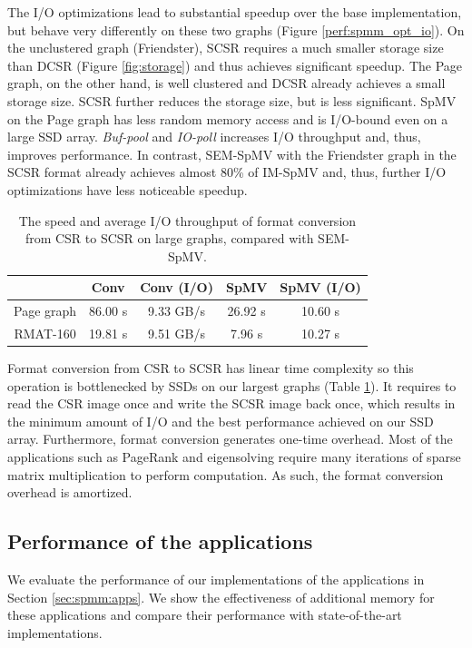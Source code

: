 The I/O optimizations lead to substantial speedup over the base implementation,
but behave very differently on these two graphs (Figure \ref{perf:spmm_opt_io}).
On the unclustered graph (Friendster), SCSR requires a much smaller storage size
than DCSR (Figure \ref{fig:storage}) and thus achieves significant
speedup. The Page graph, on the other hand, is well clustered and DCSR already
achieves a small storage size. SCSR further reduces the storage size, but is
less significant. SpMV on the Page graph has less random memory access and is
I/O-bound even on a large SSD array. \textit{Buf-pool} and \textit{IO-poll}
increases I/O throughput and, thus, improves performance. In contrast, SEM-SpMV
with the Friendster graph in the SCSR format already achieves almost 80\% of
IM-SpMV and, thus, further I/O optimizations have less noticeable speedup.

\begin{table}
\begin{center}
\footnotesize
\begin{tabular}{|c|c|c|c|c|}
\hline
	& Conv & Conv (I/O) & SpMV & SpMV (I/O) \\
\hline
Page graph & 86.00 s & 9.33 GB/s & 26.92 s & 10.60 s\\
\hline
RMAT-160 & 19.81 s & 9.51 GB/s & 7.96 s & 10.27 s\\
\hline
\end{tabular}
\normalsize
\end{center}
\caption{The speed and average I/O throughput of format conversion from CSR
	to SCSR on large graphs, compared with SEM-SpMV.}
\label{convert}
\end{table}

Format conversion from CSR to SCSR has linear time complexity so this operation
is bottlenecked by SSDs on our largest graphs (Table \ref{convert}).
It requires to read
the CSR image once and write the SCSR image back once, which results in
the minimum amount of I/O and the best performance achieved on our SSD array.
Furthermore, format conversion generates one-time overhead. Most of the applications
such as PageRank and eigensolving require many iterations of sparse matrix
multiplication to perform computation. As such, the format conversion overhead
is amortized.

\subsection{Performance of the applications}

We evaluate the performance of our implementations of the applications in
Section \ref{sec:spmm:apps}. We show the effectiveness of additional memory for
these applications and compare their performance with state-of-the-art
implementations.


